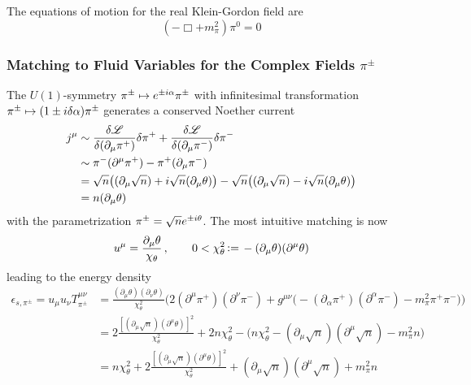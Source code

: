 The equations of motion for the real Klein-Gordon field are
\begin{equation}
    (-\Box+m_\pi^2)\pi^0=0
\end{equation}


\subsubsection{Matching to Fluid Variables for the Complex Fields $\pi^\pm$}

The $U(1)$-symmetry $\pi^\pm\mapsto e^{\pm{i}\alpha}\pi^\pm$ with infinitesimal transformation $\pi^\pm\mapsto(1\pm{i}\delta\alpha)\pi^\pm$ generates a conserved Noether current
\begin{subequations}
    \begin{align}
        j^\mu&\sim\frac{\delta\mathscr{L}}{\delta(\partial_\mu\pi^+)}\delta\pi^++\frac{\delta\mathscr{L}}{\delta(\partial_\mu\pi^-)}\delta\pi^-\\
        &\sim\pi^-(\partial^\mu\pi^+)-\pi^+(\partial_\mu\pi^-)\\
        &=\sqrt{n}\big((\partial_\mu\sqrt{n})+{i}\sqrt{n}(\partial_\mu\theta)\big)-\sqrt{n}\big((\partial_\mu\sqrt{n})-{i}\sqrt{n}(\partial_\mu\theta)\big)\\
        &=n(\partial_\mu\theta)
    \end{align}
\end{subequations}
with the parametrization $\pi^\pm=\sqrt{n}e^{\pm{i}\theta}$. The most intuitive matching is now
\begin{equation}
    u^\mu=\frac{\partial_\mu\theta}{\chi_\theta}\,,\qquad 0<\chi_\theta^2{\,\vcentcolon=\,}-(\partial_\mu\theta)(\partial^\mu\theta)
\end{equation}
leading to the energy density
\begin{subequations}
    \begin{align}
        \epsilon_{s,\pi^\pm}=u_\mu u_\nu T^{\mu\nu}_{\pi^\pm}&=\frac{(\partial_\mu\theta)(\partial_\nu\theta)}{\chi_\theta^2}\Big(2(\partial^\mu\pi^+)(\partial^\nu\pi^-)+g^{\mu\nu}\big(-(\partial_\alpha\pi^+)(\partial^\alpha\pi^-)-m_\pi^2\pi^+\pi^-\big)\Big)\\
        &=2\frac{[(\partial_\mu\sqrt{n})(\partial^\mu\theta)]^2}{\chi_\theta^2}+2n\chi_\theta^2-\big(n\chi_\theta^2-(\partial_\mu\sqrt{n})(\partial^\mu\sqrt{n})-m_\pi^2n\big)\\
        &=n\chi_\theta^2+2\frac{[(\partial_\mu\sqrt{n})(\partial^\mu\theta)]^2}{\chi_\theta^2}+(\partial_\mu\sqrt{n})(\partial^\mu\sqrt{n})+m_\pi^2n
    \end{align}
\end{subequations}
